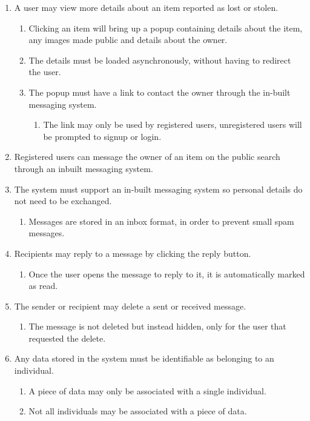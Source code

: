 \begin{enumerate}[label=\textbf{F\arabic*}]
\item A user may view more details about an item reported as lost or stolen.
	\begin{enumerate}[leftmargin=0.75in]
		\item Clicking an item will bring up a popup containing details about the item, any images made public and details about the owner.
		\item The details must be loaded asynchronously, without having to redirect the user.
		\item The popup must have a link to contact the owner through the in-built messaging system.
		\begin{enumerate}
			\item The link may only be used by registered users, unregistered users will be prompted to signup or login.
		\end{enumerate}
	\end{enumerate}
\item Registered users can message the owner of an item on the public search through an inbuilt messaging system.
\item The system must support an in-built messaging system so personal details do not need to be exchanged.
	\begin{enumerate}[leftmargin=0.75in]
		\item Messages are stored in an inbox format, in order to prevent small spam messages.
	\end{enumerate}
\item Recipients may reply to a message by clicking the reply button.
	\begin{enumerate}
		\item Once the user opens the message to reply to it, it is automatically marked as read.
	\end{enumerate}
\item The sender or recipient may delete a sent or received message.
	\begin{enumerate}[leftmargin=0.75in]
		\item The message is not deleted but instead hidden, only for the user that requested the delete.
	\end{enumerate}
\item Any data stored in the system must be identifiable as belonging to an individual.
	\begin{enumerate}[leftmargin=0.75in]
		\item A piece of data may only be associated with a single individual.
		\item Not all individuals may be associated with a piece of data.
	\end{enumerate}	
\end{enumerate}


